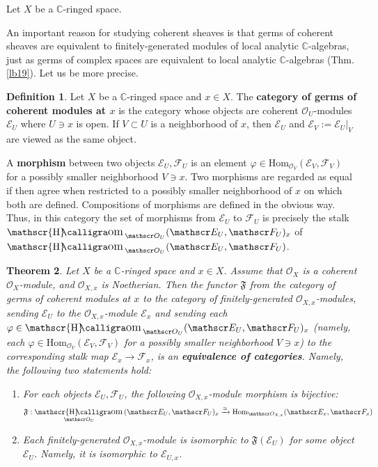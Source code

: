 \documentclass[12pt,b5paper,notitlepage]{report}
\theoremstyle{definition}
\newtheorem{df}{Definition}[section]
\theoremstyle{plain}
\newtheorem{thm}[df]{Theorem}
\DeclareMathOperator{\shom}{\mathscr{H}\text{\kern -3pt {\calligra\large om}}\,}
\newcommand{\fk}{\mathfrak}
\newcommand{\Hom}{\mathrm{Hom}}
\newcommand{\scr}{\mathscr}
\newcommand{\Cbb}{\mathbb C}
\numberwithin{equation}{section}
\begin{document}
Let $X$ be a $\Cbb$-ringed space.

An important reason for studying coherent sheaves is that germs of coherent sheaves are equivalent to finitely-generated modules of local analytic $\Cbb$-algebras, just as germs of complex spaces are equivalent to local analytic $\Cbb$-algebras (Thm. \ref{lb19}). Let us be more precise.


\begin{df}
Let $X$ be a $\Cbb$-ringed space and $x\in X$. The \textbf{category of germs of coherent modules at $x$} is the category whose objects are coherent $\scr O_U$-modules $\scr E_U$ where $U\ni x$ is open. If $V\subset U$ is a neighborhood of $x$, then $\scr E_U$ and $\scr E_V:=\scr E_U|_V$ are viewed as the same object. 

A \textbf{morphism} between two objects $\scr E_U,\scr F_U$ is an element $\varphi\in\Hom_{\scr O_V}(\scr E_V,\scr F_V)$ for a possibly smaller neighborhood $V\ni x$. Two morphisms are regarded as equal if then agree when restricted to a possibly smaller neighborhood of $x$ on which both are defined. Compositions of morphisms are defined in the obvious way. Thus, in this category the set of morphisms from $\scr E_U$ to $\scr F_U$ is precisely the stalk $\shom_{\scr O_U}(\scr E_U,\scr F_U)_x$ of $\shom_{\scr O_U}(\scr E_U,\scr F_U)$. \hfill\qedsymbol
\end{df}





\begin{thm}\label{lb49}
Let $X$ be a $\Cbb$-ringed space and $x\in X$. Assume that $\scr O_X$ is a coherent $\scr O_X$-module, and $\scr O_{X,x}$ is Noetherian. Then the functor $\fk F$ from the category of germs of coherent modules at $x$ to the category of finitely-generated $\scr O_{X,x}$-modules, sending $\scr E_U$ to the $\scr O_{X,x}$-module $\scr E_x$ and sending each $\varphi\in\shom_{\scr O_U}(\scr E_U,\scr F_U)_x$ (namely, each $\varphi\in\Hom_{\scr O_V}(\scr E_V,\scr F_V)$ for a possibly smaller neighborhood $V\ni x$) to the corresponding stalk map $\scr E_x\rightarrow\scr F_x$, is an \textbf{equivalence of categories}.  Namely, the following two statements hold:
\begin{enumerate}[label=(\arabic*)]
\item For each objects $\scr E_U,\scr F_U$, the following $\scr O_{X,x}$-module morphism is bijective:
\begin{align}\label{eq23}
\fk F:\shom_{\scr O_U}(\scr E_U,\scr F_U)_x\xrightarrow{\simeq}\Hom_{\scr O_{X,x}}(\scr E_x,\scr F_x)
\end{align}
\item Each finitely-generated $\scr O_{X,x}$-module is isomorphic to $\fk F(\scr E_U)$ for some object $\scr E_U$. Namely, it is isomorphic to $\scr E_{U,x}$.
\end{enumerate}
\end{thm}
\end{document}
